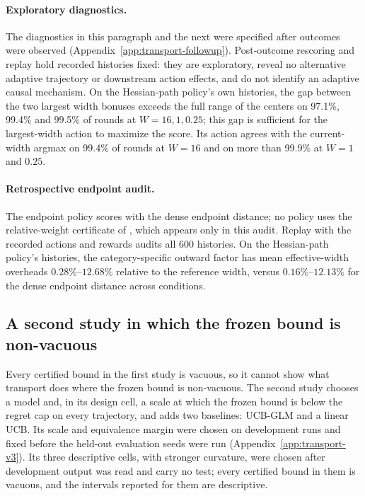 \paragraph{Exploratory diagnostics.}
The diagnostics in this paragraph and the next were specified after outcomes
were observed
(Appendix~\ref{app:transport-followup}). Post-outcome rescoring and replay
hold recorded histories fixed: they are exploratory, reveal no alternative
adaptive trajectory or downstream action effects, and do not identify an
adaptive causal mechanism.
On the Hessian-path policy's own histories, the gap between the two largest
width bonuses exceeds the full range of the centers on 97.1\%, 99.4\% and
99.5\% of rounds at $W=16,1,0.25$; this gap is sufficient for the
largest-width action to maximize the score. Its action agrees with the
current-width argmax on 99.4\% of rounds at $W=16$ and on more than 99.9\% at
$W=1$ and $0.25$.

\paragraph{Retrospective endpoint audit.}
The endpoint policy scores with the dense endpoint distance; no policy uses the
relative-weight certificate of , which appears
only in this audit. Replay with the recorded actions and rewards audits all
600 histories. On the Hessian-path policy's histories, the
category-specific outward factor has mean effective-width overheads
$0.28\%$--$12.68\%$ relative to the reference width, versus $0.16\%$--$12.13\%$
for the dense endpoint distance across conditions.

\subsection{A second study in which the frozen bound is non-vacuous}
\label{sec:transport-v3}

Every certified bound in the first study is vacuous, so it cannot show what
transport does where the frozen bound is non-vacuous. The second study chooses
a model and, in its design cell, a scale at which the frozen bound is below
the regret cap on every trajectory, and adds two baselines: UCB-GLM
\citep{li2017provably} and a linear UCB. Its scale and equivalence margin were
chosen on development runs and fixed before the held-out evaluation seeds were
run (Appendix~\ref{app:transport-v3}). Its three descriptive cells, with
stronger curvature, were chosen after development output was read and carry
no test; every certified bound in them is vacuous, and the intervals reported
for them are descriptive.

